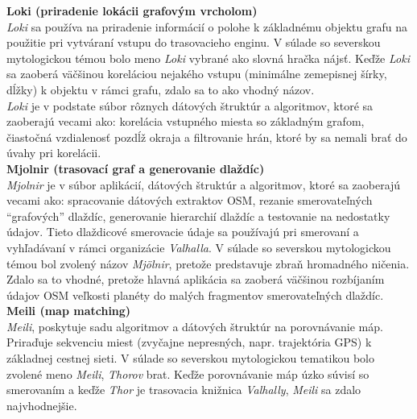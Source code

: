 \noindent \textbf{Loki (priradenie lokácii grafovým vrcholom)}\\ %
\indent \textit{Loki} sa používa na priradenie informácií o polohe k základnému objektu grafu na použitie pri vytváraní vstupu do trasovacieho enginu. V súlade so severskou mytologickou témou bolo meno \textit{Loki} vybrané ako slovná hračka nájsť. Keďže \textit{Loki} sa zaoberá väčšinou koreláciou nejakého vstupu (minimálne zemepisnej šírky, dĺžky) k objektu v rámci grafu, zdalo sa to ako vhodný názov.\\
\indent \textit{Loki} je v podstate súbor rôznych dátových štruktúr a algoritmov, ktoré sa zaoberajú vecami ako: korelácia vstupného miesta so základným grafom, čiastočná vzdialenosť pozdĺž okraja a filtrovanie hrán, ktoré by sa nemali brať do úvahy pri korelácii.\cite{loki} \\

\noindent \textbf{Mjolnir (trasovací graf a generovanie dlaždíc)}\\
\indent \textit{Mjolnir} je v súbor aplikácií, dátových štruktúr a algoritmov, ktoré sa zaoberajú vecami ako: spracovanie dátových extraktov OSM, rezanie smerovateľných ``grafových'' dlaždíc, generovanie hierarchií dlaždíc a testovanie na nedostatky údajov. Tieto dlaždicové smerovacie údaje sa používajú pri smerovaní a vyhľadávaní v rámci organizácie \textit{Valhalla}. V súlade so severskou mytologickou témou bol zvolený názov \textit{Mjölnir}, pretože predstavuje zbraň hromadného ničenia. Zdalo sa to vhodné, pretože hlavná aplikácia sa zaoberá väčšinou rozbíjaním údajov OSM veľkosti planéty do malých fragmentov smerovateľných dlaždíc. \cite{mjolnir} \\%

\noindent \textbf{Meili (map matching)}\\  %
\indent \textit{Meili}, poskytuje sadu algoritmov a dátových štruktúr na porovnávanie máp. Priraďuje sekvenciu miest (zvyčajne nepresných, napr. trajektória GPS) k základnej cestnej sieti. V súlade so severskou mytologickou tematikou bolo zvolené meno \textit{Meili}, \textit{Thorov} brat. Keďže porovnávanie máp úzko súvisí so smerovaním a keďže \textit{Thor} je trasovacia knižnica \textit{Valhally}, \textit{Meili} sa zdalo najvhodnejšie. \cite{meili}


